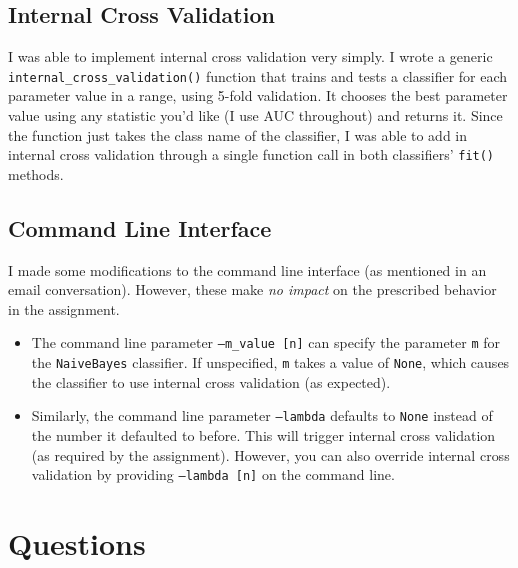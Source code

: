 \documentclass[fleqn]{homework}
\begin{document}
  \subsection{Internal Cross Validation}

  I was able to implement internal cross validation very simply.  I wrote a
  generic \texttt{internal\_cross\_validation()} function that trains and tests
  a classifier for each parameter value in a range, using 5-fold validation.  It
  chooses the best parameter value using any statistic you'd like (I use AUC
  throughout) and returns it.  Since the function just takes the class name of
  the classifier, I was able to add in internal cross validation through a
  single function call in both classifiers' \texttt{fit()} methods.

  \subsection{Command Line Interface}

  I made some modifications to the command line interface (as mentioned in an
  email conversation).  However, these make \textit{no impact} on the prescribed
  behavior in the assignment.

  \begin{itemize}
  \item The command line parameter \texttt{--m\_value [n]} can specify the
    parameter \texttt{m} for the \texttt{NaiveBayes} classifier.  If
    unspecified, \texttt{m} takes a value of \texttt{None}, which causes the
    classifier to use internal cross validation (as expected).
  \item Similarly, the command line parameter \texttt{--lambda} defaults to
    \texttt{None} instead of the number it defaulted to before.  This will
    trigger internal cross validation (as required by the assignment).  However,
    you can also override internal cross validation by providing
    \texttt{--lambda [n]} on the command line.
  \end{itemize}

  \section{Questions}
\end{document}
